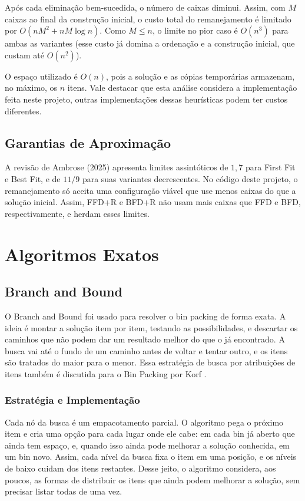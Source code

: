 \documentclass[12pt]{article}
\begin{document}
Após cada eliminação bem-sucedida, o número de caixas diminui. Assim, com $M$ caixas ao final da construção inicial, o custo total do remanejamento é limitado por $O(nM^2+nM\log n)$. Como $M\leq n$, o limite no pior caso é $O(n^3)$ para ambas as variantes (esse custo já domina a ordenação e a construção inicial, que custam até $O(n^2)$).

O espaço utilizado é $O(n)$, pois a solução e as cópias temporárias armazenam, no máximo, os $n$ itens. Vale destacar que esta análise considera a implementação feita neste projeto, outras implementações dessas heurísticas podem ter custos diferentes.

\subsection{Garantias  de Aproximação}

A revisão de Ambrose (2025) apresenta limites assintóticos de $1{,}7$ para First Fit e Best Fit, e de $11/9$ para suas variantes decrescentes. No código deste projeto, o remanejamento só aceita uma configuração viável que use menos caixas do que a solução inicial. Assim, FFD+R e BFD+R não usam mais caixas que FFD e BFD, respectivamente, e herdam esses limites.

\section{Algoritmos Exatos}

\subsection{Branch and Bound}

O Branch and Bound foi usado para resolver o bin packing de forma exata. A ideia é montar a solução item por item, testando as possibilidades, e descartar os caminhos que não podem dar um resultado melhor do que o já encontrado. A busca vai até o fundo de um caminho antes de voltar e tentar outro, e os itens são tratados do maior para o menor. Essa estratégia de busca por atribuições de itens também é discutida para o Bin Packing por Korf \cite{korf2002}.

\subsubsection{Estratégia e Implementação}

Cada nó da busca é um empacotamento parcial. O algoritmo pega o próximo item e cria uma opção para cada lugar onde ele cabe: em cada bin já aberto que ainda tem espaço, e, quando isso ainda pode melhorar a solução conhecida, em um bin novo. Assim, cada nível da busca fixa o item em uma posição, e os níveis de baixo cuidam dos itens restantes. Desse jeito, o algoritmo considera, aos poucos, as formas de distribuir os itens que ainda podem melhorar a solução, sem precisar listar todas de uma vez.
\end{document}
